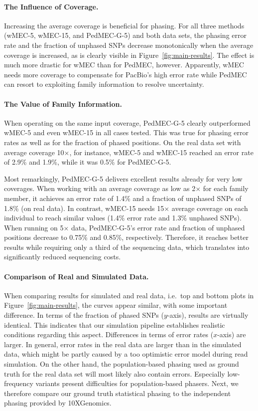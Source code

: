 \paragraph{The Influence of Coverage.}
Increasing the average coverage is beneficial for phasing.
For all three methods (wMEC-5, wMEC-15, and \mbox{PedMEC-G-5}) and both data sets, the phasing error rate and the fraction of unphased SNPs decrease monotonically when the average coverage is increased, as is clearly visible in Figure~\ref{fig:main-results}.
The effect is much more drastic for wMEC than for PedMEC, however.
Apparently, wMEC needs more coverage to compensate for PacBio's high error rate while PedMEC can resort to exploiting family information to resolve uncertainty.

\paragraph{The Value of Family Information.}
When operating on the same input coverage, \mbox{PedMEC-G-5} clearly outperformed wMEC-5 and even wMEC-15 in all cases tested.
This was true for phasing error rates as well as for the fraction of phased positions.
On the real data set with average coverage 10$\times$, for instance, wMEC-5 and wMEC-15 reached an error rate of 2.9\% and 1.9\%, while it was 0.5\% for \mbox{PedMEC-G-5}.

Most remarkingly, \mbox{PedMEC-G-5} delivers excellent results already for very low coverages.
When working with an average coverage as low as 2$\times$ for each family member, it achieves an error rate of 1.4\% and a fraction of unphased SNPs of 1.8\% (on real data).
In contrast, wMEC-15 needs 15$\times$ average coverage on each individual to reach similar values (1.4\% error rate and 1.3\% unphased SNPs).
When running on 5$\times$ data, \mbox{PedMEC-G-5}'s error rate and fraction of unphased positions decrease to 0.75\% and 0.85\%, respectively.
Therefore, it reaches better results while requiring only a third of the sequencing data, which translates into significantly reduced sequencing costs.


\paragraph{Comparison of Real and Simulated Data.}
When comparing results for simulated and real data, i.e.\ top and bottom plots in Figure~\ref{fig:main-results}, the curves appear similar, with some important difference.
In terms of the fraction of phased SNPs ($y$-axis), results are virtually identical.
This indicates that our simulation pipeline establishes realistic conditions regarding this aspect.
Differences in terms of error rates ($x$-axis) are larger.
In general, error rates in the real data are larger than in the simulated data, which might be partly caused by a too optimistic error model during read simulation.
On the other hand, the population-based phasing used as ground truth for the real data set will most likely also contain errors.
Especially low-frequency variants present difficulties for population-based phasers.
Next, we therefore compare our ground truth statistical phasing to the independent phasing provided by 10XGenomics.

